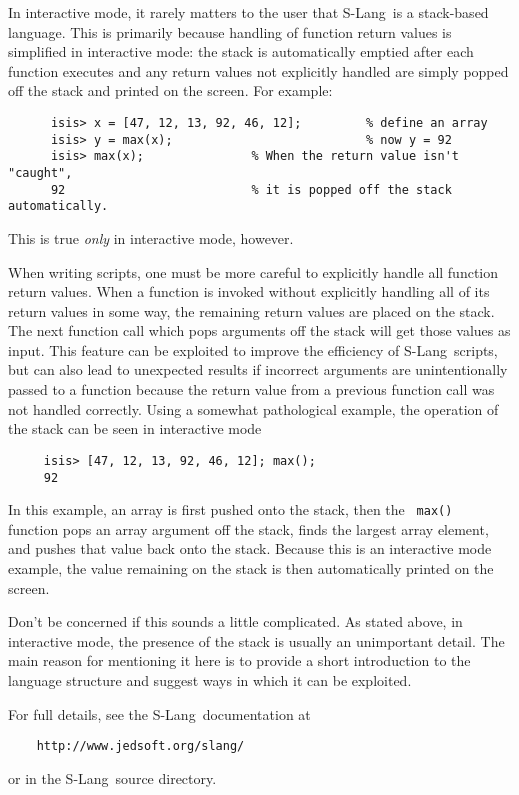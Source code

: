 \documentclass{book}
\newcommand{\slang}{{\sc S-Lang}}
\begin{document}
In interactive mode, it rarely matters to the user that \slang\ is a stack-based
language.  This is primarily because handling of function return values is
simplified in interactive mode: the stack is automatically emptied after
each function executes and any return values not explicitly handled are
simply popped off the stack and printed on the screen.
For example:
\begin{verbatim}
      isis> x = [47, 12, 13, 92, 46, 12];         % define an array
      isis> y = max(x);                           % now y = 92
      isis> max(x);               % When the return value isn't "caught",
      92                          % it is popped off the stack automatically.
\end{verbatim}
This is true {\it only} in interactive mode, however.

When writing scripts, one must be more careful to explicitly handle all
function return values.  When a function is invoked without explicitly
handling all of its return values in some way, the remaining return values
are placed on the stack.  The next function call which pops arguments off
the stack will get those values as input. This feature can be exploited to
improve the efficiency of \slang{}ripts, but can also lead to unexpected
results if incorrect arguments are unintentionally passed to a function
because the return value from a previous function call was not handled
correctly.  Using a somewhat pathological example, the operation of the
stack can be seen in interactive mode
\begin{verbatim}
     isis> [47, 12, 13, 92, 46, 12]; max();
     92
\end{verbatim}
In this example, an array is first pushed onto the stack, then the {\tt
max() } function pops an array argument off the stack, finds the largest
array element, and pushes that value back onto the stack.  Because this is an
interactive mode example, the value remaining on the stack is then
automatically printed on the screen.

Don't be concerned if this sounds a little complicated. As stated above, in
interactive mode, the presence of the stack is usually an unimportant
detail.  The main reason for mentioning it here is to provide a short
introduction to the language structure and suggest ways in which it can be
exploited.

For full details, see the \slang\ documentation at
\begin{verbatim}
    http://www.jedsoft.org/slang/
\end{verbatim}
or in the \slang\ source directory.
\end{document}
